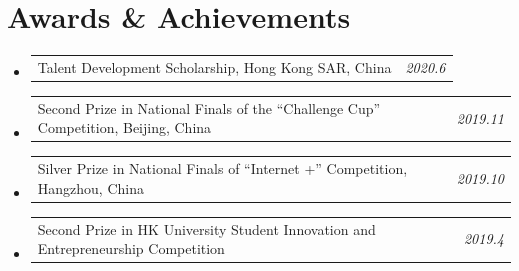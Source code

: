 \documentclass[a4paper,11pt]{article}
\makeatletter
\newcommand{\resumeProject}[2]{
  \vspace{0.5mm}\item
  \begin{tabular*}{0.98\textwidth}[t]{l@{\extracolsep{\fill}}r}
    \small{#1} & \textit{\footnotesize{#2}} \\
  \end{tabular*}
  \vspace{-2.4mm}
}
\newcommand{\resumeSubHeadingListStart}{\begin{itemize}[leftmargin=*,labelsep=0mm]}
\newcommand{\resumeSubHeadingListEnd}{\end{itemize}\vspace{2mm}}
\makeatother
\begin{document}
\section{\textbf{Awards \& Achievements}}
\vspace{-0.4mm}
\resumeSubHeadingListStart
  \resumeProject{Talent Development Scholarship, Hong Kong SAR, China}{2020.6}
  \resumeProject{Second Prize in National Finals of the “Challenge Cup” Competition, Beijing, China}{2019.11}
  \resumeProject{Silver Prize in National Finals of “Internet +” Competition, Hangzhou, China}{2019.10}
  \resumeProject{Second Prize in HK University Student Innovation and Entrepreneurship Competition}{2019.4}

\resumeSubHeadingListEnd
\vspace{-5mm}


\end{document}
